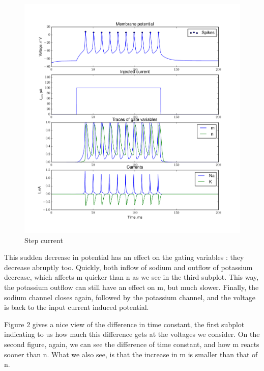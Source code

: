 \documentclass[a4paper,11pt]{article} %
\begin{document}
\begin{figure}[H]
    \centering
    \includegraphics[width=\textwidth]{step_cur}
    \caption{Step current}
    \label{fig:step}
\end{figure}

This sudden decrease in potential has an effect on the gating variables
: they decrease abruptly too. Quickly, both inflow of sodium and
outflow of potassium decrease, which affects m quicker than n as
we see in the third subplot. This way, the potassium outflow can
still have an effect on m, but much slower. Finally, the sodium channel
closes again, followed by the potassium channel, and the voltage
is back to the input current induced potential.

Figure 2 gives a nice view of the difference in time constant,
the first subplot indicating to us how much this difference gets
at the voltages we consider. On the second figure, again, we can
see the difference of time constant, and how m reacts sooner than
n. What we also see, is that the increase in m is smaller than
that of n.
\end{document}
